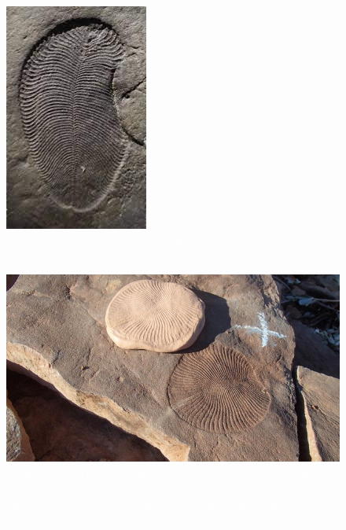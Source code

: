 \documentclass[aspectratio=169]{beamer} %
\begin{document}
{\begin{frame}
    \begin{minipage}{0.5\textwidth}
	    \begin{figure}
	\centering
        \includegraphics[scale=0.3]{images/faunaediacara3.jpeg} %
		    \caption{\textcolor{white}{\textit{Dickinsonia costata}, é um dos registros fósseis mais comum desse tempo.}} %
	    \end{figure}
    \end{minipage}%
		\pause
    \begin{minipage}{0.5\textwidth}
	    \begin{figure}
        \centering
        \includegraphics[scale=0.25]{images/faunaediacaran2.jpg} %
		    \caption{\textcolor{white}{Deslocava-se entre o sedimento de fundo, geralmente areias finas. Este espécime tinha cerca  de 6 centímetros de diâmtetro e fora encontrado, no sul da Austrália, e se alimentavam de tapetes microbialinos.}} %
	    \end{figure}
    \end{minipage}

\flushright
		\textcolor{blue}{\citep{Droser2024}}
		
	\end{frame}
}
\end{document}
